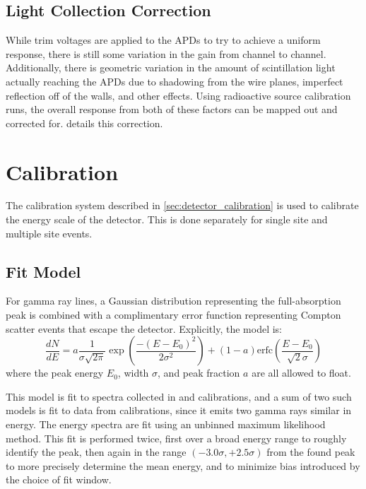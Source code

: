 \documentclass[herrin-thesis.tex]{subfiles}
\begin{document}
\subsection{Light Collection Correction}
While trim voltages are applied to the APDs to try to achieve a uniform response, there is still some variation in the gain from channel to channel. Additionally, there is geometric variation in the amount of scintillation light actually reaching the APDs due to shadowing from the wire planes, imperfect reflection off of the walls, and other effects. Using radioactive source calibration runs, the overall response from both of these factors can be mapped out and corrected for.  details this correction.

\section{Calibration}
The calibration system described in \cref{sec:detector_calibration} is used to calibrate the energy scale of the detector. This is done separately for single site and multiple site events.
\subsection{Fit Model}
For gamma ray lines, a Gaussian distribution representing the full-absorption peak is combined with a complimentary error function representing Compton scatter events that escape the detector. Explicitly, the model is:
\begin{equation}
\frac{dN}{dE} = a \frac{1}{\sigma\sqrt{2\pi}}\exp\left(\frac{-(E-E_0)^2}{2\sigma^2}\right)+ (1-a)\text{erfc}\left(\frac{E-E_0}{\sqrt{2}\sigma}\right)
\label{eq:data_fitmodel}
\end{equation}
where the peak energy \(E_0\), width \(\sigma\), and peak fraction \(a\) are all allowed to float.

This model is fit to spectra collected in  and   calibrations, and a sum of two such models is fit to data from  calibrations, since it emits two gamma rays similar in energy. The energy spectra are fit using an unbinned maximum likelihood method. This fit is performed twice, first over a broad energy range to roughly identify the peak, then again in the range \((-3.0\sigma, +2.5\sigma)\) from the found peak to more precisely determine the mean energy, and to minimize bias introduced by the choice of fit window.
\end{document}
